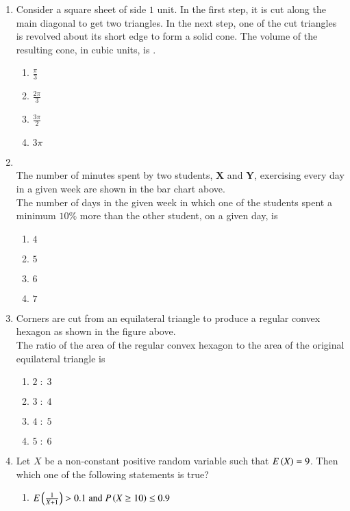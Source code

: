 \documentclass[journal,12pt,onecolumn]{IEEEtran}
\theoremstyle{remark}
\begin{document}
\begin{enumerate}
\begin{enumerate}
\end{enumerate}
\item Consider a square sheet of side $1$ unit. In the first step, it is cut along the main diagonal to get two triangles. In the next step, one of the cut triangles is revolved about its short edge to form a solid cone. The volume of the resulting cone, in cubic units, is \underline{\hspace{2cm}}.
\begin{enumerate}
    \item $\frac{\pi}{3}$
    \item $\frac{2\pi}{3}$
    \item $\frac{3\pi}{2}$
    \item $3\pi$
\end{enumerate}
\item 
 \\
The number of minutes spent by two students, \textbf{X} and \textbf{Y}, exercising every day in a given week are shown in the bar chart above.\\ The number of days in the given week in which one of the students spent a minimum $10\%$ more than the other student, on a given day, is
\begin{enumerate}
    \item $4$
    \item $5$
    \item $6$
    \item $7$
\end{enumerate}
\item 
Corners are cut from an equilateral triangle to produce a regular convex hexagon as shown in the figure above.\\ 

The ratio of the area of the regular convex hexagon to the area of the original equilateral triangle is
\begin{enumerate}
    \item $2\;:\;3$
    \item $3\;:\;4$
    \item $4\;:\;5$
    \item $5\;:\;6$
\end{enumerate}
\item Let $X$ be a non-constant positive random variable such that $E\left(X\right)=9$. Then which one of the following statements is true?
\begin{enumerate}
    \item $E\left(\frac{1}{X+1}\right)>0.1 \; \text{and} \; P\left(X\geq10\right)\leq0.9$

\end{enumerate}
\end{enumerate}
\end{document}
